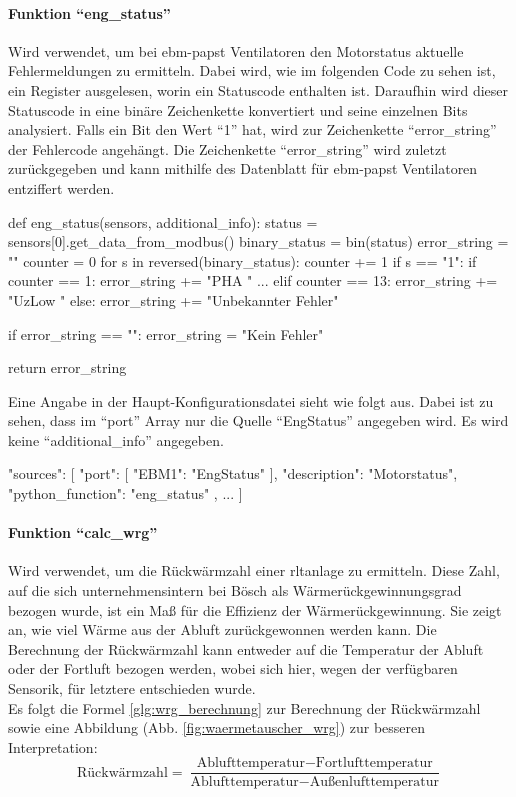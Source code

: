 \paragraph{Funktion \enquote{eng\_status}}
Wird verwendet, um bei ebm-papst Ventilatoren den Motorstatus \bzw aktuelle Fehlermeldungen zu ermitteln. Dabei wird, wie im folgenden Code zu sehen ist, ein Register ausgelesen, worin ein Statuscode enthalten ist. Daraufhin wird dieser Statuscode in eine binäre Zeichenkette konvertiert und seine einzelnen Bits analysiert. Falls ein Bit den Wert \enquote{1} hat, wird zur Zeichenkette \enquote{error\_string} der Fehlercode angehängt. Die Zeichenkette \enquote{error\_string} wird zuletzt zurückgegeben und kann mithilfe des Datenblatt für ebm-papst Ventilatoren \cite[vgl.][119]{ebmpapst:2020} entziffert werden. 

\begin{pythoncode}
def eng_status(sensors, additional_info):
	status = sensors[0].get_data_from_modbus()
	binary_status = bin(status)
	error_string = ""
	counter = 0
	for s in reversed(binary_status):
		counter += 1
		if s == "1":
			if counter == 1:
				error_string += "PHA "
			...
			elif counter == 13:
				error_string += "UzLow "
			else:
				error_string += "Unbekannter Fehler"
			
	if error_string == "":
		error_string = "Kein Fehler"
	
	return error_string
\end{pythoncode}

Eine Angabe in der Haupt-Konfigurationsdatei sieht wie folgt aus. Dabei ist zu sehen, dass im \enquote{port} Array nur die Quelle \enquote{EngStatus} angegeben wird. Es wird keine \enquote{additional\_info} angegeben.

\begin{jsoncode}
"sources": [
	{
		"port": [
			{"EBM1": "EngStatus"}
		],
		"description": "Motorstatus",
		"python_function": "eng_status"
	},
	...
]
\end{jsoncode}



\paragraph{Funktion \enquote{calc\_wrg}}
Wird verwendet, um die Rückwärmzahl einer \acs{rltanlage} zu ermitteln. Diese Zahl, auf die sich unternehmensintern bei Bösch als Wärmerückgewinnungsgrad bezogen wurde, ist ein Maß für die Effizienz der Wärmerückgewinnung. Sie zeigt an, wie viel Wärme aus der Abluft zurückgewonnen werden kann. Die Berechnung der Rückwärmzahl kann entweder auf die Temperatur der Abluft oder der Fortluft bezogen werden, wobei sich hier, wegen der verfügbaren Sensorik, für letztere entschieden wurde. \cite[vgl.][]{Klingenburg:o.J.}\\
Es folgt die Formel \eqref{glg:wrg_berechnung} zur Berechnung der Rückwärmzahl sowie eine Abbildung (Abb. \ref{fig:waermetauscher_wrg}) zur besseren Interpretation: 
\begin{equation}
	\text{Rückwärmzahl} = \frac{\text{Ablufttemperatur} - \text{Fortlufttemperatur}}{\text{Ablufttemperatur} - \text{Außenlufttemperatur}}
	\label{glg:wrg_berechnung}
\end{equation} 

